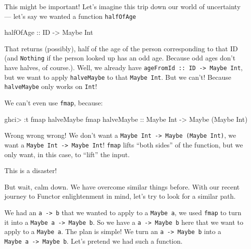 \documentclass[]{article}
\newenvironment{Shaded}{}{}
\newcommand{\DataTypeTok}[1]{\textcolor[rgb]{0.56,0.13,0.00}{{#1}}}
\newcommand{\OtherTok}[1]{\textcolor[rgb]{0.00,0.44,0.13}{{#1}}}
\newcommand{\FunctionTok}[1]{\textcolor[rgb]{0.02,0.16,0.49}{{#1}}}
\newcommand{\NormalTok}[1]{{#1}}
\begin{document}
This might be important! Let's imagine this trip down our world of
uncertainty --- let's say we wanted a function \texttt{halfOfAge}

\begin{Shaded}
\begin{Highlighting}[]
\OtherTok{halfOfAge ::} \DataTypeTok{ID} \OtherTok{->} \DataTypeTok{Maybe} \DataTypeTok{Int}
\end{Highlighting}
\end{Shaded}

That returns (possibly), half of the age of the person corresponding to
that ID (and \texttt{Nothing} if the person looked up has an odd age.
Because odd ages don't have halves, of course.). Well, we already have
\texttt{ageFromId\ ::\ ID\ -\textgreater{}\ Maybe\ Int}, but we want to
apply \texttt{halveMaybe} to that \texttt{Maybe\ Int}. But we can't!
Because \texttt{halveMaybe} only works on \texttt{Int}!

We can't even use \texttt{fmap}, because:

\begin{Shaded}
\begin{Highlighting}[]
\NormalTok{ghci}\FunctionTok{>} \FunctionTok{:}\NormalTok{t fmap halveMaybe}
\NormalTok{fmap}\OtherTok{ halveMaybe ::} \DataTypeTok{Maybe} \DataTypeTok{Int} \OtherTok{->} \DataTypeTok{Maybe} \NormalTok{(}\DataTypeTok{Maybe} \DataTypeTok{Int}\NormalTok{)}
\end{Highlighting}
\end{Shaded}

Wrong wrong wrong! We don't want a
\texttt{Maybe\ Int\ -\textgreater{}\ Maybe\ (Maybe\ Int)}, we want a
\texttt{Maybe\ Int\ -\textgreater{}\ Maybe\ Int}! \texttt{fmap} lifts
``both sides'' of the function, but we only want, in this case, to
``lift'' the input.

This is a disaster!

But wait, calm down. We have overcome similar things before. With our
recent journey to Functor enlightenment in mind, let's try to look for a
similar path.

We had an \texttt{a\ -\textgreater{}\ b} that we wanted to apply to a
\texttt{Maybe\ a}, we used \texttt{fmap} to turn it into a
\texttt{Maybe\ a\ -\textgreater{}\ Maybe\ b}. So we have a
\texttt{a\ -\textgreater{}\ Maybe\ b} here that we want to apply to a
\texttt{Maybe\ a}. The plan is simple! We turn an
\texttt{a\ -\textgreater{}\ Maybe\ b} into a
\texttt{Maybe\ a\ -\textgreater{}\ Maybe\ b}. Let's pretend we had such
a function.
\end{document}
